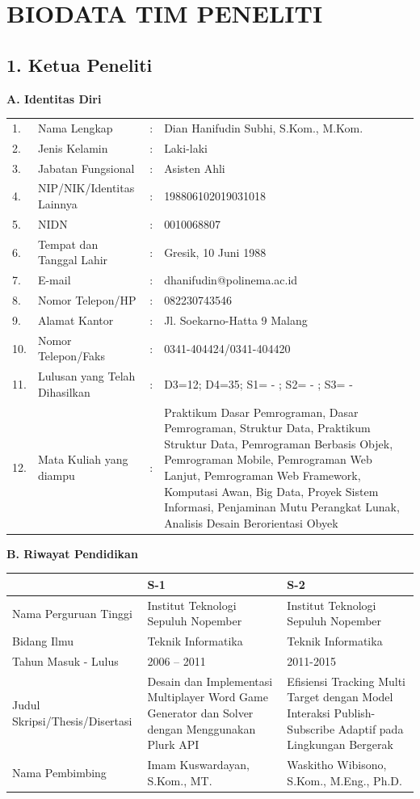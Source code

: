 \chapter{BIODATA TIM PENELITI}

\section*{1. Ketua Peneliti}

\textbf{A. Identitas Diri}

{\footnotesize
\begin{longtable}{@{}p{0.8cm}p{6cm}p{0.3cm}p{8cm}}
1. & Nama Lengkap & : & Dian Hanifudin Subhi, S.Kom., M.Kom. \\
2. & Jenis Kelamin & : & Laki-laki \\
3. & Jabatan Fungsional & : & Asisten Ahli \\
4. & NIP/NIK/Identitas Lainnya & : & 198806102019031018 \\
5. & NIDN & : & 0010068807 \\
6. & Tempat dan Tanggal Lahir & : & Gresik, 10 Juni 1988 \\
7. & E-mail & : & dhanifudin@polinema.ac.id \\
8. & Nomor Telepon/HP & : & 082230743546 \\
9. & Alamat Kantor & : & Jl. Soekarno-Hatta 9 Malang \\
10. & Nomor Telepon/Faks & : & 0341-404424/0341-404420 \\
11. & Lulusan yang Telah Dihasilkan & : & D3=12; D4=35; S1= - ; S2= - ; S3= - \\
12. & Mata Kuliah yang diampu & : & Praktikum Dasar Pemrograman, Dasar Pemrograman, Struktur Data, Praktikum Struktur Data, Pemrograman Berbasis Objek, Pemrograman Mobile, Pemrograman Web Lanjut, Pemrograman Web Framework, Komputasi Awan, Big Data, Proyek Sistem Informasi, Penjaminan Mutu Perangkat Lunak, Analisis Desain Berorientasi Obyek \\
\end{longtable}
}

\textbf{B. Riwayat Pendidikan}

{\footnotesize
\begin{longtable}{|p{3.5cm}|p{5.5cm}|p{5.5cm}|}
\hline
& \textbf{S-1} & \textbf{S-2} \\
\hline
Nama Perguruan Tinggi & Institut Teknologi Sepuluh Nopember & Institut Teknologi Sepuluh Nopember \\
\hline
Bidang Ilmu & Teknik Informatika & Teknik Informatika \\
\hline
Tahun Masuk - Lulus & 2006 – 2011 & 2011-2015 \\
\hline
Judul Skripsi/Thesis/Disertasi & Desain dan Implementasi Multiplayer Word Game Generator dan Solver dengan Menggunakan Plurk API & Efisiensi Tracking Multi Target dengan Model Interaksi Publish-Subscribe Adaptif pada Lingkungan Bergerak \\
\hline
Nama Pembimbing & Imam Kuswardayan, S.Kom., MT. & Waskitho Wibisono, S.Kom., M.Eng., Ph.D. \\
\hline
\end{longtable}
}

